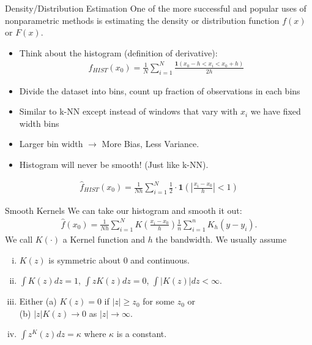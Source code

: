 \documentclass[11pt,handout,xcolor=pdftex,dvipsnames,table,mathserif]{beamer}
\begin{document}
\begin{frame}{Density/Distribution Estimation}
One of the more successful and popular uses of nonparametric methods is estimating the density or distribution function $f(x)$ or $F(x)$.
\begin{itemize}
\item Think about the histogram (definition of derivative):
\begin{eqnarray*}
\hat{f}_{HIST}(x_0) = \frac{1}{N} \sum_{i=1}^N \frac{\mathbf{1}(x_0 - h < x_i < x_0 + h)}{2 h}
\end{eqnarray*}
\item Divide the dataset into bins, count up fraction of observations in each bins
\item Similar to k-NN except instead of windows that vary with $x_i$ we have fixed width bins
\item Larger bin width $\rightarrow$ More Bias, Less Variance.
\item Histogram will never be smooth! (Just like k-NN).
\end{itemize}
\begin{eqnarray*}
\hat{f}_{HIST}(x_0) = \frac{1}{Nh} \sum_{i=1}^N  \frac{1}{2} \cdot \mathbf{1} \left (|\frac{x_i - x_0}{h}| < 1 \right)
\end{eqnarray*}
\end{frame}

\begin{frame}{Smooth Kernels}
We can take our histogram and smooth it out:
\begin{eqnarray*}
\hat{f}(x_0) = \frac{1}{Nh} \sum_{i=1}^N  K  \left(\frac{x_i - x_0}{h} \right)  \frac{1}{n}\sum_{i=1}^n K_h\left(
y-y_i\right).
\end{eqnarray*}
We call $K(\cdot)$ a \alert{Kernel function} and $h$ the \alert{bandwidth}. We usually assume
\begin{enumerate}[(i)]
\item $K(z)$ is symmetric about $0$ and continuous.
\item $\int K(z) d z = 1$,  $\int z K(z) d z = 0$,  $\int |K(z)| d z < \infty$.
\item Either (a) $K(z) = 0$ if $|z| \geq z_0$ for some $z_0$ or \\
(b) $|z| K(z) \rightarrow 0$ as $|z| \rightarrow \infty$.
\item $\int z^ K(z) d z = \kappa$ where $\kappa$ is a constant.
\end{enumerate}
\end{frame}
\end{document}
